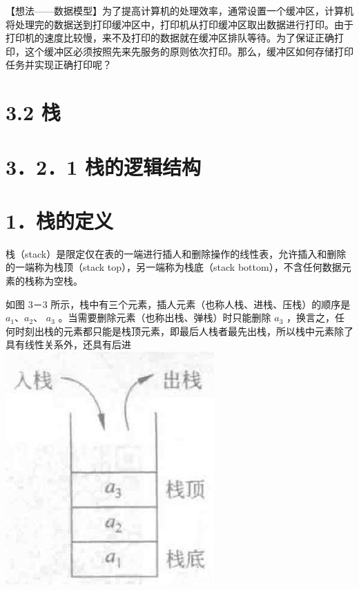 \documentclass[10pt]{article}
\begin{document}
【想法——数据模型】为了提高计算机的处理效率，通常设置一个缓冲区，计算机将处理完的数据送到打印缓冲区中，打印机从打印缓冲区取出数据进行打印。由于打印机的速度比较慢，来不及打印的数据就在缓冲区排队等待。为了保证正确打印，这个缓冲区必须按照先来先服务的原则依次打印。那么，缓冲区如何存储打印任务并实现正确打印呢？

\section*{3.2 栈}
\section*{3．2．1 栈的逻辑结构}
\section*{1．栈的定义}
栈（stack）是限定仅在表的一端进行插人和删除操作的线性表，允许插入和删除的一端称为栈顶（stack top），另一端称为栈底（stack bottom），不含任何数据元素的栈称为空栈。

如图 3－3 所示，栈中有三个元素，插人元素（也称人栈、进栈、压栈）的顺序是 $a_{1} 、 a_{2} 、$ $a_{3}$ 。当需要删除元素（也称出栈、弹栈）时只能删除 $a_{3}$ ，换言之，任何时刻出栈的元素都只能是栈顶元素，即最后人栈者最先出栈，所以栈中元素除了具有线性关系外，还具有后进\\
\includegraphics[max width=\textwidth, center]{2025_06_06_704745ea57b15b2333e5g-084(1)}
\end{document}
